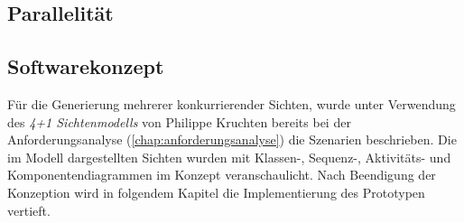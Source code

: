 

    
    

    \subsection{Parallelität}



\subsection{Softwarekonzept}
\label{subsec:softwarekonzept}


Für die Generierung mehrerer konkurrierender Sichten, wurde unter Verwendung des \textit{4+1 Sichtenmodells} von Philippe Kruchten \cite{Kruchten1995}
bereits bei der Anforderungsanalyse (\ref{chap:anforderungsanalyse}) die Szenarien beschrieben. Die im Modell dargestellten Sichten wurden mit 
Klassen-, Sequenz-, Aktivitäts- und Komponentendiagrammen im Konzept veranschaulicht. Nach Beendigung der Konzeption wird in folgendem Kapitel die 
Implementierung des Prototypen vertieft. 
